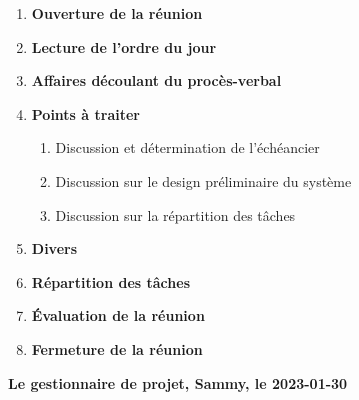 \documentclass[12pt]{ULojpv}
\begin{document}
\entete
\begin{enumerate}
   \item \textbf{Ouverture de la réunion}
   \item \textbf{Lecture de l'ordre du jour}
   \item \textbf{Affaires découlant du procès-verbal}
   
   \item \textbf{Points à traiter}
      \begin{enumerate}
         \item Discussion et détermination de l'échéancier
         \item Discussion sur le design préliminaire du système
         \item Discussion sur la répartition des tâches
      \end{enumerate}
   \item \textbf{Divers}
   \item \textbf{Répartition des tâches}
   \item \textbf{Évaluation de la réunion}

   \item \textbf{Fermeture de la réunion}
\end{enumerate}

\begin{flushright}
   \textbf{Le gestionnaire de projet, Sammy, le 2023-01-30}

\end{flushright}
\end{document}
